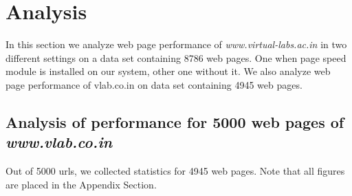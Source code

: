 \documentclass[conference]{IEEEtran}
\begin{document}
\section{Analysis}\label{sec-6}
In this section we analyze web page performance of {\it www.virtual-labs.ac.in} in two different settings on a data set containing 8786 web pages.
One when page speed module is installed on our system, other one without it. We also analyze web page performance of vlab.co.in  
on data set containing 4945 web pages.
\subsection{Analysis of performance for 5000 web pages of {\it www.vlab.co.in}}
 Out of 5000 urls, we collected statistics for 4945 web pages. Note that all figures are placed in the Appendix Section.
\end{document}
